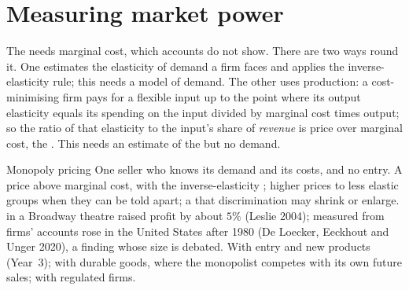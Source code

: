 \section{Measuring market power}\label{sec:b1:monopoly-pricing:measuring}

The  needs marginal cost, which accounts do not show. There are
two ways round it. One estimates the elasticity of demand a firm faces and
applies the inverse-elasticity rule; this needs a model of demand. The
other uses production: a cost-minimising firm pays for a flexible input up
to the point where its output elasticity equals its spending on the input
divided by marginal cost times output; so the ratio of that elasticity to
the input's share of \emph{revenue} is price over marginal cost, the
. This needs an estimate of the  but no
demand.

\begin{model}{Monopoly pricing}
\assumes One seller who knows its demand and its costs, and no entry.
\predicts A price above marginal cost, with the inverse-elasticity ;
higher prices to less elastic groups when they can be told apart; a
 that discrimination may shrink or enlarge.
\tested {} in a Broadway theatre raised profit by about
$5\%$ (Leslie 2004); %
 measured from firms' accounts rose in the United States after 1980
(De Loecker, Eeckhout and Unger 2020), a finding whose size is debated.
\breaks With entry and new products (Year~3); with durable goods, where the
monopolist competes with its own future sales; with regulated firms.
\end{model}


